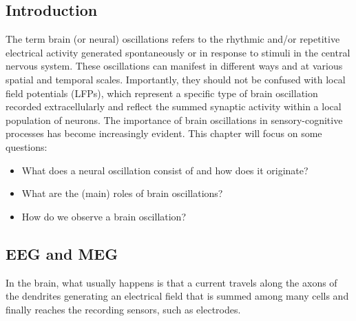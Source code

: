 \subsection{Introduction}
The term brain (or neural) oscillations refers to the rhythmic and/or repetitive electrical activity generated spontaneously or in response to stimuli in the central nervous system. These oscillations can manifest in different ways and at various spatial and temporal scales. Importantly, they should not be confused with local field potentials (LFPs), which represent a specific type of brain oscillation recorded extracellularly and reflect the summed synaptic activity within a local population of neurons. The importance of brain oscillations in sensory-cognitive processes has become increasingly evident. This chapter will focus on some questions:
\begin{itemize}
	\item What does a neural oscillation consist of and how does it originate?
	\item What are the (main) roles of brain oscillations?
	\item How do we observe a brain oscillation?
\end{itemize}

\subsection{EEG and MEG}
In the brain, what usually happens is that a current travels along the axons of the dendrites
generating an electrical field that is summed among many cells and finally reaches the
recording sensors, such as electrodes.\\

